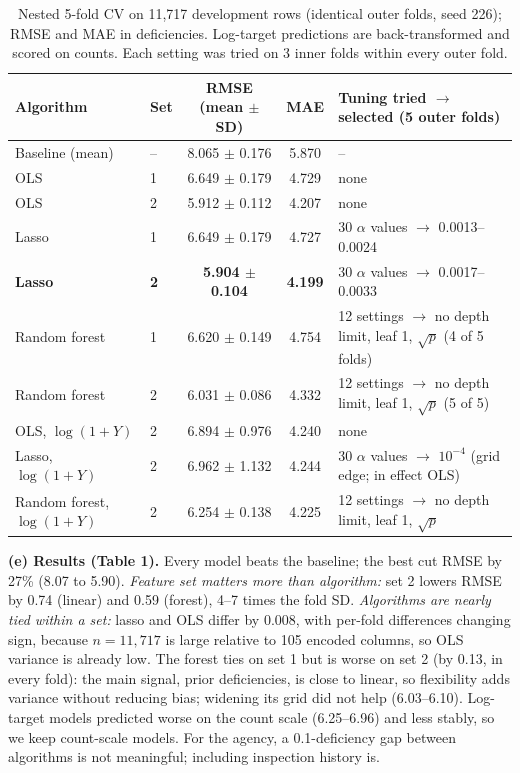 \documentclass[11pt]{article}
\begin{document}
\begin{table}[!ht]\centering\footnotesize
\begin{tabularx}{\linewidth}{llccX}
\toprule
Algorithm & Set & RMSE (mean $\pm$ SD) & MAE & Tuning tried $\rightarrow$ selected (5 outer folds) \\
\midrule
Baseline (mean) & -- & 8.065 $\pm$ 0.176 & 5.870 & -- \\
OLS & 1 & 6.649 $\pm$ 0.179 & 4.729 & none \\
OLS & 2 & 5.912 $\pm$ 0.112 & 4.207 & none \\
Lasso & 1 & 6.649 $\pm$ 0.179 & 4.727 & 30 $\alpha$ values $\rightarrow$ 0.0013--0.0024 \\
\textbf{Lasso} & \textbf{2} & \textbf{5.904 $\pm$ 0.104} & \textbf{4.199} & 30 $\alpha$ values $\rightarrow$ 0.0017--0.0033 \\
Random forest & 1 & 6.620 $\pm$ 0.149 & 4.754 & 12 settings $\rightarrow$ no depth limit, leaf 1, $\sqrt{p}$ (4 of 5 folds) \\
Random forest & 2 & 6.031 $\pm$ 0.086 & 4.332 & 12 settings $\rightarrow$ no depth limit, leaf 1, $\sqrt{p}$ (5 of 5) \\
\midrule
OLS, $\log(1+Y)$ & 2 & 6.894 $\pm$ 0.976 & 4.240 & none \\
Lasso, $\log(1+Y)$ & 2 & 6.962 $\pm$ 1.132 & 4.244 & 30 $\alpha$ values $\rightarrow$ $10^{-4}$ (grid edge; in effect OLS) \\
Random forest, $\log(1+Y)$ & 2 & 6.254 $\pm$ 0.138 & 4.225 & 12 settings $\rightarrow$ no depth limit, leaf 1, $\sqrt{p}$ \\
\bottomrule
\end{tabularx}
\caption{Nested 5-fold CV on 11{,}717 development rows (identical outer folds, seed 226); RMSE and MAE in deficiencies. Log-target predictions are back-transformed and scored on counts. Each setting was tried on 3 inner folds within every outer fold.}
\end{table}

\textbf{(e) Results (Table 1).} Every model beats the baseline; the best cut RMSE by 27\% (8.07 to 5.90). \emph{Feature set matters more than algorithm:} set 2 lowers RMSE by 0.74 (linear) and 0.59 (forest), 4--7 times the fold SD. \emph{Algorithms are nearly tied within a set:} lasso and OLS differ by 0.008, with per-fold differences changing sign, because $n=11{,}717$ is large relative to 105 encoded columns, so OLS variance is already low. The forest ties on set 1 but is worse on set 2 (by 0.13, in every fold): the main signal, prior deficiencies, is close to linear, so flexibility adds variance without reducing bias; widening its grid did not help (6.03--6.10). Log-target models predicted worse on the count scale (6.25--6.96) and less stably, so we keep count-scale models. For the agency, a 0.1-deficiency gap between algorithms is not meaningful; including inspection history is.
\end{document}
